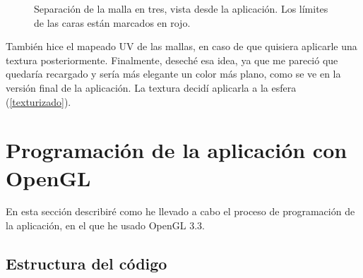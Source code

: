 \documentclass[a4paper,12pt]{article}
\begin{document}
\begin{figure}[h]
    \centering
    \caption{Separación de la malla en tres, vista desde la aplicación. Los límites de las caras están marcados en rojo.} \label{separacion_caras_triangulo}
\end{figure}

También hice el mapeado UV de las mallas, en caso de que quisiera aplicarle una textura posteriormente. Finalmente, deseché esa idea, ya que me pareció que quedaría recargado y sería más elegante un color más plano, como se ve en la versión final de la aplicación. La textura decidí aplicarla a la esfera (\ref{texturizado}).

\section{Programación de la aplicación con OpenGL}

En esta sección describiré como he llevado a cabo el proceso de programación de la aplicación, en el que he usado OpenGL 3.3.

\subsection{Estructura del código}
\end{document}
